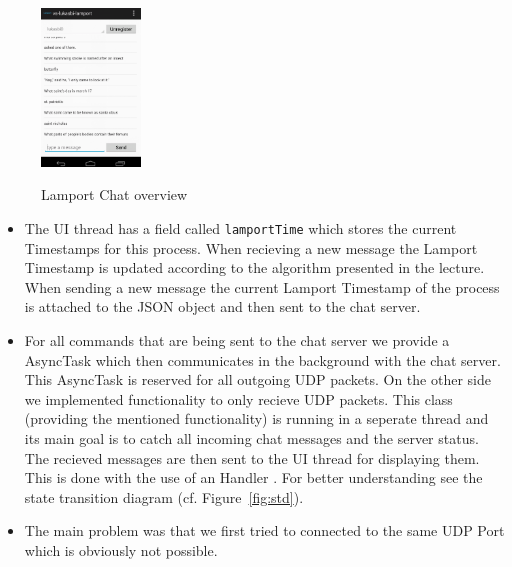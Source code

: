 \documentclass{report}
\newcommand{\lfig}[1]{\label{fig:#1}}
\newcommand{\rfig}[1]{Figure~\ref{fig:#1}}
\begin{document}
\begin{figure}
    \centering
    \includegraphics[height=4.2cm]{lamport.png}
    \lfig{axis}   
    \caption{Lamport Chat overview}
\end{figure}
\begin{itemize}
  
  \item The UI thread has a field called \texttt{lamportTime} which stores the current Timestamps for this process. When recieving a new message the Lamport Timestamp is updated according to the algorithm presented in the lecture. When sending a new message the current Lamport Timestamp of the process is attached to the JSON object and then sent to the chat server.
  \item For all commands that are being sent to the chat server we provide a AsyncTask which then communicates in the background with the chat server. This AsyncTask \cite{androidAsyncTask} is reserved for all outgoing UDP packets. On the other side we implemented functionality to only recieve UDP packets. This class (providing the mentioned functionality) is running in a seperate thread and its main goal is to catch all incoming chat messages and the server status. The recieved messages are then sent to the UI thread for displaying them. This is done with the use of an Handler \cite{androidHandler}. For better understanding see the state transition diagram (cf. \rfig{std}).
  \item The main problem was that we first tried to connected to the same UDP Port which is obviously not possible.
\end{itemize}
\end{document}
